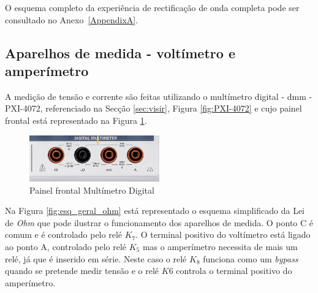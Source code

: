 O esquema completo da experiência de rectificação de onda completa pode ser consultado no Anexo~\ref{AppendixA}.




\subsection{Aparelhos de medida - voltímetro e amperímetro}
\label{sec:aparelhosmedida}

A medição de tensão e corrente são feitas utilizando o multímetro digital - \Acrfull{dmm} - PXI-4072, referenciado na Secção \ref{sec:visir}, Figura \ref{fig:PXI-4072} e cujo painel frontal está representado na Figura \ref{fig:frontDMM}.

\begin{figure}[hbtp]
	\centering
	\includegraphics[width=0.5\textwidth]{figures/promenorDMM.png}
	\caption{Painel frontal Multímetro Digital}
	\label{fig:frontDMM}
\end{figure}

Na Figura \ref{fig:esq_geral_ohm} está representado o esquema simplificado da Lei de \textit{Ohm} que pode ilustrar o funcionamento dos aparelhos de medida. O ponto C é comum e é controlado pelo relé $K_{7}$. O terminal positivo do voltímetro está ligado ao ponto A, controlado pelo relé $K_{5}$ mas o amperímetro necessita de mais um relé, já que é inserido em série. Neste caso o relé $K_{8}$ funciona como um \textit{bypass} quando se pretende medir tensão e o relé $K{6}$ controla o terminal positivo do amperímetro. 

